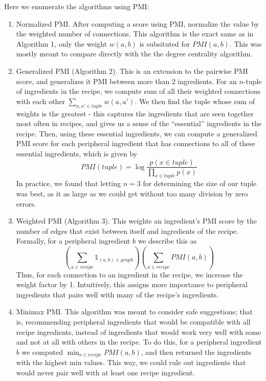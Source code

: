 \documentclass{acm_proc_article-sp}
\begin{document}
Here we enumerate the algorithms using PMI:
\begin{enumerate}
	\item Normalized PMI. After computing a score using PMI, normalize the value by the weighted number
	of connections. This algorithm is the exact same as in Algorithm 1, only the weight $w(a,b)$ is subsituted for $PMI(a,b)$. This was mostly meant to compare directly with the the degree centrality algorithm.
	\item Generalized PMI (Algorithm 2). This is an extension to the pairwise PMI score, and generalizes it PMI between more than 2 ingredients. For an $n$-tuple of ingredients in the recipe, we compute sum of all their weighted connections with each other $\sum_{a, a' \in tuple} w(a,a')$. We then find the tuple whose
	sum of weights is the greatest - this captures the ingredients that are seen together most often in recipes,
	and gives us a sense of the ``essential'' ingredients in the recipe. Then, using these essential ingredients,
	we can compute a generalized PMI score for each peripheral ingredient that has connections to all of
	these essential ingredients, which is given by 
	\[
		PMI(tuple) = \log \frac{p(x \in tuple)}{\prod_{x \in tuple}p(x)}
	\]
	In practice, we found that letting $n = 3$ for determining the size of our tuple was best, as
	it as large as we could get without too many division by zero errors. 
       \item Weighted PMI (Algorithm 3). This weights an ingredient's PMI score by the number of edges that exist between
       itself and ingredients of the recipe. Formally, for a peripheral ingredient $b$ we describe this as
       \[
              (\sum_{a \in recipe} \mathds{1}_{(a, b) \in graph})(\sum_{a \in recipe} PMI(a, b))
       \]
       Thus, for each connection to an ingredient in the recipe, we increase the weight factor by 1. Intuitively, this assigns more importance to peripheral ingredients
       that pairs well with many of the recipe's ingredients. 
	\item Minimax PMI. This algorithm was meant to consider safe suggestions; that is, recommending peripheral ingredients that would be compatible with all recipe ingredients, instead of ingredients
	that would work very well with some and not at all with others in the recipe. To do this,
	for a peripheral ingredient $b$ we computed $\min_{a \in recipe} PMI(a,b)$, and then 
	returned the ingredients with the highest min values. This way, we could rule out ingredients
	that would never pair well with at least one recipe ingredient.
\end{enumerate}
\end{document}
